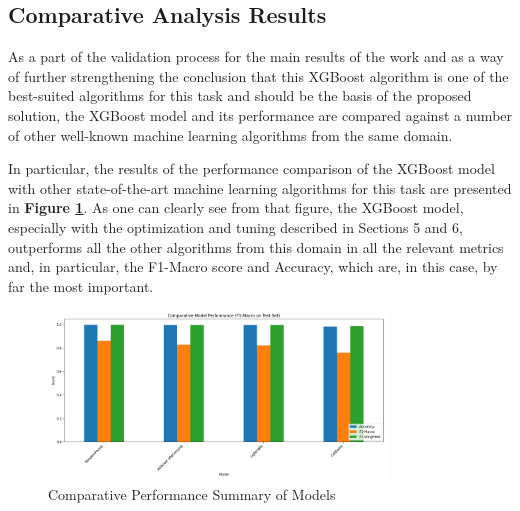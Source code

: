 \subsection{Comparative Analysis Results} 

As a part of the validation process for the main results of the work and as a way of further strengthening the conclusion that this XGBoost algorithm is one of the best-suited algorithms for this task and should be the basis of the proposed solution, the XGBoost model and its performance are compared against a number of other well-known machine learning algorithms from the same domain.

In particular, the results of the performance comparison of the XGBoost model with other state-of-the-art machine learning algorithms for this task are presented in \textbf{Figure \ref{fig:comparative_performance_summary}}. As one can clearly see from that figure, the XGBoost model, especially with the optimization and tuning described in Sections 5 and 6, outperforms all the other algorithms from this domain in all the relevant metrics and, in particular, the F1-Macro score and Accuracy, which are, in this case, by far the most important.

\begin{figure}[H]
\centering
\includegraphics[width=0.8\textwidth]{assets/figures/results/comparative_performance_summary.png}
\caption{Comparative Performance Summary of Models}
\label{fig:comparative_performance_summary}
\end{figure}
